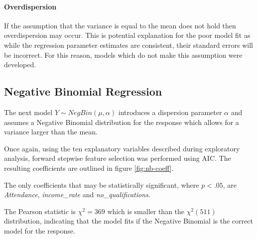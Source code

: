 \documentclass{thesis}
\begin{document}
\paragraph{Overdispersion}

If the assumption that the variance is equal to the mean does not hold then overdispersion may occur. This is potential explanation for the poor model fit as while the regression parameter estimates are consistent, their standard errors will be incorrect. For this reason, models which do not make this assumption were developed.

\subsection{Negative Binomial Regression}

The next model $Y \sim NegBin(\mu, \alpha)$ introduces a dispersion parameter $\alpha$ and assumes a Negative Binomial distribution for the response which allows for a variance larger than the mean.

Once again, using the ten explanatory variables described during exploratory analysis, forward stepwise feature selection was performed using AIC. The resulting coefficients are outlined in figure \ref{fig:nb-coeff}.

The only coefficients that may be statistically significant, where $p < .05$, are \textit{Attendance}, \textit{income\_rate} and \textit{no\_qualifications}.

The Pearson statistic is $\chi^2 = 369$ which is smaller than the $\chi^2(511)$ distribution, indicating that the model fits if the Negative Binomial is the correct model for the response.
\end{document}
